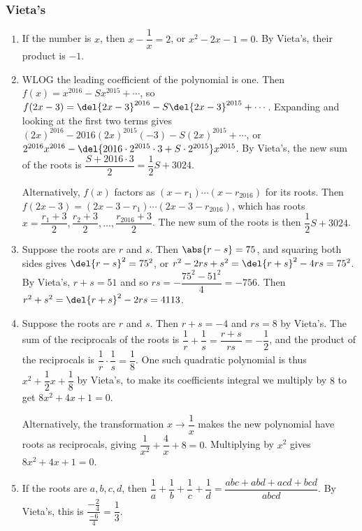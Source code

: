 \documentclass[10pt,paper=letter]{scrartcl}
\begin{document}
\subsubsection*{Vieta's}

\begin{enumerate}

\item If the number is $x$, then $x - \dfrac1x = 2$, or $x^2 - 2x - 1 = 0$. By Vieta's, their product is $-1$.

\item WLOG the leading coefficient of the polynomial is one. Then $f(x) = x^{2016} - Sx^{2015} + \cdots$, so $f(2x - 3) = \del{2x - 3}^{2016} - S\del{2x - 3}^{2015} + \cdots$. Expanding and looking at the first two terms gives $(2x)^{2016} - 2016(2x)^{2015}(-3) - S(2x)^{2015} + \cdots$, or $2^{2016}x^{2016} - \del{2016\cdot2^{2015}\cdot3 + S\cdot2^{2015}}x^{2015}$. By Vieta's, the new sum of the roots is $\dfrac{S + 2016\cdot3}2 = \dfrac12S + 3024$.

Alternatively, $f(x)$ factors as $(x - r_1)\cdots(x-r_{2016})$ for its roots. Then $f(2x - 3) = (2x - 3 - r_1)\cdots(2x - 3 - r_{2016})$, which has roots $x = \dfrac{r_1 + 3}2, \dfrac{r_2 + 3}2, \ldots, \dfrac{r_{2016} + 3}2$. The new sum of the roots is then $\dfrac12S + 3024$.

\item Suppose the roots are $r$ and $s$. Then $\abs{r - s} = 75$, and squaring both sides gives $\del{r - s}^2 = 75^2$, or $r^2 - 2rs + s^2 = \del{r + s}^2 - 4rs = 75^2$. By Vieta's, $r + s = 51$ and so $rs = -\dfrac{75^2 - 51^2}4 = -756$. Then $r^2 + s^2 = \del{r + s}^2 - 2rs = 4113$.

\item Suppose the roots are $r$ and $s$. Then $r + s = -4$ and $rs = 8$ by Vieta's. The sum of the reciprocals of the roots is $\dfrac1r + \dfrac1s = \dfrac{r+s}{rs} = -\dfrac12$, and the product of the reciprocals is $\dfrac1r \cdot \dfrac1s = \dfrac18$. One such quadratic polynomial is thus $x^2 + \dfrac12x + \dfrac18$ by Vieta's, to make its coefficients integral we multiply by $8$ to get $8x^2 + 4x + 1 = 0$.

Alternatively, the transformation $x \to \dfrac1x$ makes the new polynomial have roots as reciprocals, giving $\dfrac1{x^2} + \dfrac4x + 8 = 0$. Multiplying by $x^2$ gives $8x^2 + 4x + 1 = 0$.

\item If the roots are $a, b, c, d$, then $\dfrac1a + \dfrac1b + \dfrac1c + \dfrac1d = \dfrac{abc + abd + acd + bcd}{abcd}$. By Vieta's, this is $\dfrac{-\frac24}{\frac{-6}4} = \dfrac13$.


\end{enumerate}
\end{document}
